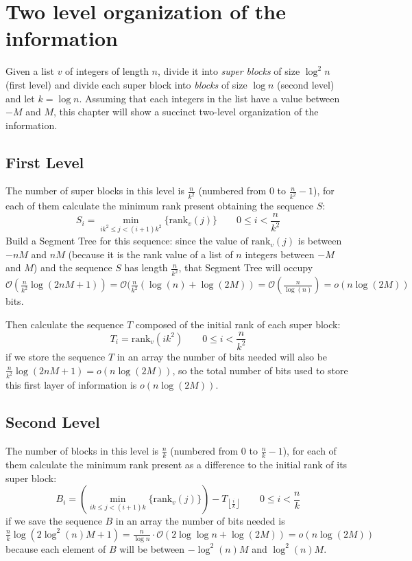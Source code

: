 \documentclass{article}
\begin{document}
\section{Two level organization of the information}
Given a list $v$ of integers of length $n$, divide it into \textit{super blocks} of size $\log^2{n}$ (first level) and divide each super block into \textit{blocks} of size $\log{n}$ (second level) and let $k=\log{n}$. Assuming that each integers in the list have a value between $-M$ and $M$, this chapter will show a succinct two-level organization of the information.

\subsection{First Level}
The number of super blocks in this level is $\frac{n}{k^2}$ (numbered from $0$ to $\frac{n}{k^2}-1$), for each of them calculate the minimum rank present obtaining the sequence $S$:
    $$
    S_i = \min_{ik^2 \leq j < (i+1)k^2}\{\text{rank}_v(j)\} \qquad 0\leq i < \frac{n}{k^2}
    $$
Build a Segment Tree for this sequence: since the value of $\text{rank}_v(j)$ is between $-nM$ and $nM$ (because it is the rank value of a list of $n$ integers between $-M$ and $M$) and the sequence $S$ has length $\frac{n}{k^2}$, that Segment Tree will occupy $\mathcal{O}(\frac{n}{k^2}\log{(2nM+1)})=\mathcal{O}(\frac{n}{k^2}(\log{(n)}+\log{(2M)})=\mathcal{O}(\frac{n}{\log{(n)}})=o(n\log{(2M)})$ bits.

Then calculate the sequence $T$ composed of the initial rank of each super block:
    $$
    T_i = \text{rank}_v(ik^2) \qquad 0\leq i < \frac{n}{k^2}
    $$
if we store the sequence $T$ in an array the number of bits needed will also be $\frac{n}{k^2}\log{(2nM+1)}=o(n\log{(2M)})$, so the total number of bits used to store this first layer of information is $o(n\log{(2M)})$.

\subsection{Second Level}
The number of blocks in this level is $\frac{n}{k}$ (numbered from $0$ to $\frac{n}{k}-1$), for each of them calculate the minimum rank present as a difference to the initial rank of its super block:
    $$
    B_i = \left(\min_{ik \leq j < (i+1)k}\{\text{rank}_v(j)\}\right)-T_{\left\lfloor{\frac{i}{k}}\right\rfloor} \qquad 0\leq i < \frac{n}{k}
    $$
if we save the sequence $B$ in an array the number of bits needed is $\frac{n}{k}\log{(2\log^2{(n)}M+1)}=\frac{n}{\log{n}}\cdot\mathcal{O}(2\log{\log{n}}+\log{(2M)})=o(n\log{(2M)})$ because each element of $B$ will be between $-\log^2{(n)}M$ and $\log^2{(n)}M$.
\end{document}
